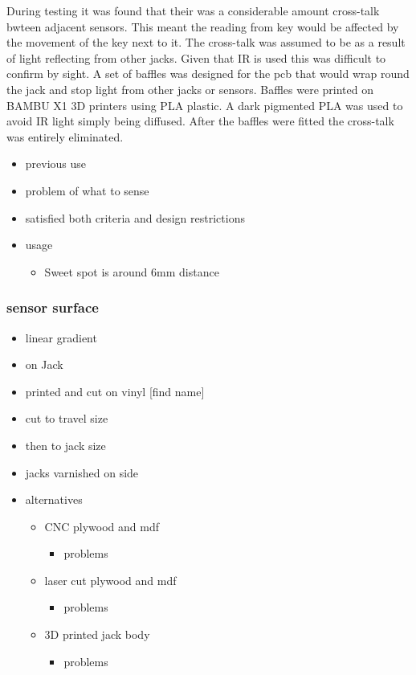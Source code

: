 During testing it was found that their was a considerable amount
cross-talk bwteen adjacent sensors. This meant the reading from key
would be affected by the movement of the key next to it. The cross-talk
was assumed to be as a result of light reflecting from other jacks.
Given that IR is used this was difficult to confirm by sight. A set of
baffles was designed for the pcb that would wrap round the jack and stop
light from other jacks or sensors. Baffles were printed on BAMBU X1 3D
printers using PLA plastic. A dark pigmented PLA was used to avoid IR
light simply being diffused. After the baffles were fitted the
cross-talk was entirely eliminated.

\begin{itemize}
\item
  previous use
\item
  problem of what to sense
\item
  satisfied both criteria and design restrictions
\item
  usage

  \begin{itemize}
  \item
    Sweet spot is around 6mm distance
  \end{itemize}
\end{itemize}

\subsubsection{sensor surface}\label{sensor-surface}

\begin{itemize}
\item
  linear gradient
\item
  on Jack
\item
  printed and cut on vinyl {[}find name{]}
\item
  cut to travel size
\item
  then to jack size
\item
  jacks varnished on side
\item
  alternatives

  \begin{itemize}
  \item
    CNC plywood and mdf

    \begin{itemize}
    \item
      problems
    \end{itemize}
  \item
    laser cut plywood and mdf

    \begin{itemize}
    \item
      problems
    \end{itemize}
  \item
    3D printed jack body

    \begin{itemize}
    \item
      problems
    \end{itemize}
  \end{itemize}
\end{itemize}

